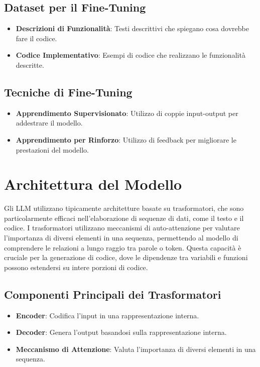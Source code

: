 \documentclass[12pt,a4paper,openright,twoside]{book}
\begin{document}
\subsection{Dataset per il Fine-Tuning}
\begin{itemize}
    \item \textbf{Descrizioni di Funzionalità}: Testi descrittivi che spiegano cosa dovrebbe fare il codice.
    \item \textbf{Codice Implementativo}: Esempi di codice che realizzano le funzionalità descritte.
\end{itemize}

\subsection{Tecniche di Fine-Tuning}
\begin{itemize}
    \item \textbf{Apprendimento Supervisionato}: Utilizzo di coppie input-output per addestrare il modello.
    \item \textbf{Apprendimento per Rinforzo}: Utilizzo di feedback per migliorare le prestazioni del modello.
\end{itemize}

\section{Architettura del Modello}
Gli LLM utilizzano tipicamente architetture basate su trasformatori, che sono particolarmente efficaci nell'elaborazione di sequenze di dati, come il testo e il codice. I trasformatori utilizzano meccanismi di auto-attenzione per valutare l'importanza di diversi elementi in una sequenza, permettendo al modello di comprendere le relazioni a lungo raggio tra parole o token. Questa capacità è cruciale per la generazione di codice, dove le dipendenze tra variabili e funzioni possono estendersi su intere porzioni di codice.

\subsection{Componenti Principali dei Trasformatori}
\begin{itemize}
    \item \textbf{Encoder}: Codifica l'input in una rappresentazione interna.
    \item \textbf{Decoder}: Genera l'output basandosi sulla rappresentazione interna.
    \item \textbf{Meccanismo di Attenzione}: Valuta l'importanza di diversi elementi in una sequenza.
\end{itemize}
\end{document}
